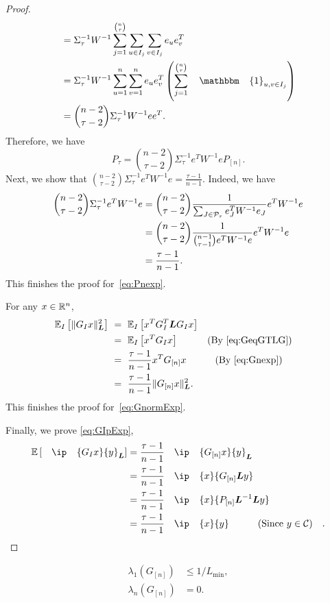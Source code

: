 \begin{proof}
\begin{align*}
        &= \Sigma_\tau^{-1} W^{-1} \sum_{j=1}^{\binom{n}{\tau}} \sum_{u \in I_j} \sum_{v \in I_j} e_ue_v^T\\
        &= \Sigma_\tau^{-1} W^{-1} \sum_{u=1}^n \sum_{v=1}^n e_ue_v^T \left(\sum_{j=1}^{\binom{n}{\tau}} \mathbbm{1}_{u,v \in I_j} \right)\\
        &= \binom{n-2}{\tau-2}\Sigma_\tau^{-1}W^{-1}ee^T.
    \end{align*}
    Therefore, we have 
    \[P_\tau = \binom{n-2}{\tau-2}\Sigma_\tau^{-1}e^TW^{-1}e P_{[n]}.\]
    Next, we show that $\binom{n-2}{\tau-2}\Sigma_\tau^{-1}e^TW^{-1}e = \frac{\tau-1}{n-1}$. Indeed, we have 
    \begin{align*}
        \binom{n-2}{\tau-2}\Sigma_\tau^{-1}e^TW^{-1}e &= \binom{n-2}{\tau-2}\frac{1}{\sum_{J \in \mathcal{P}_\tau} e_J^TW^{-1}e_J}e^TW^{-1}e\\
        &= \binom{n-2}{\tau-2} \frac{1}{\binom{n-1}{\tau-1}e^TW^{-1}e}e^TW^{-1}e\\
        &= \frac{\tau-1}{n-1}.
    \end{align*}
    This finishes the proof for~\eqref{eq:Pnexp}.
    
    For any $x\in \mathbb{R}^n$,
    \begin{align*}
        \mathbb{E}_I \left[ \| G_I x \|_{\boldsymbol{L}}^2 \right] &~=~ \mathbb{E}_I \left[ x^T G_I^T \boldsymbol{L} G_I x \right] \\
        &~=~ \mathbb{E}_I \left[ x^T G_I x \right] \qquad \hbox{\quad(By \eqref{eq:GeqGTLG})\quad} \\
        &~=~ \frac{\tau - 1}{n-1}   x^T G_{[n]} x  \qquad \hbox{\quad(By \eqref{eq:Gnexp})\quad} \\
        &~=~ \frac{\tau - 1}{n-1} \| G_{[n]} x \|^2_{\boldsymbol{L}}.
    \end{align*}
    This finishes the proof for~\eqref{eq:GnormExp}.
    
    Finally, we prove \eqref{eq:GIpExp},
    \begin{align*}
        \mE \left[\ip{G_Ix}{y}_{\bL} \right] &= \frac{\tau - 1}{n-1} \ip{G_{[n]}x}{y}_{\bL}\\
        &= \frac{\tau - 1}{n-1} \ip{x}{G_{[n]}\bL y}\\
        &= \frac{\tau - 1}{n-1} \ip{x}{P_{[n]}\bL^{-1}\bL y}\\
        &= \frac{\tau - 1}{n-1} \ip{x}{y}  \qquad \text{(Since $y \in \Cscr$)}.
    \end{align*}
\end{proof}

\begin{lemma}[Eigenvalues of $G_{[n]}$] \label{lemma:eigenG}
    \begin{align}
        \lambda_1 ( G_{[n]} ) &\leq 1/L_{\min}, \label{eq:largestEigenValG} \\
        \lambda_n ( G_{[n]} ) & = 0. \label{eq:smallestEigenValG}
    \end{align}
\end{lemma}

